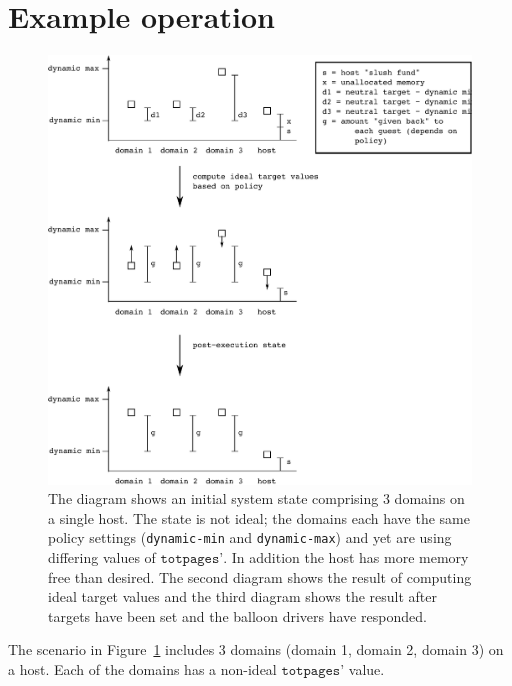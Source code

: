 \documentclass{article}
\begin{document}
\section{Example operation}
\label{example}

\begin{figure}
\begin{center}
\includegraphics{fig/calculation}
\end{center}
\caption{The diagram shows an initial system state comprising 3 domains on a single host. The state is not ideal; the domains each have the same policy settings (\texttt{dynamic-min} and \texttt{dynamic-max}) and yet are using differing values of $\texttt{totpages'}$. 
 In addition the host has more memory free than desired. The second diagram shows the result of computing ideal target values and the third diagram shows the result after targets have been set and the balloon drivers have responded.}
\label{calculation}
\end{figure}

The scenario in Figure~\ref{calculation} includes 3 domains (domain 1, domain 2, domain 3) on a host. Each of the domains has a non-ideal $\texttt{totpages'}$ value.
\end{document}
